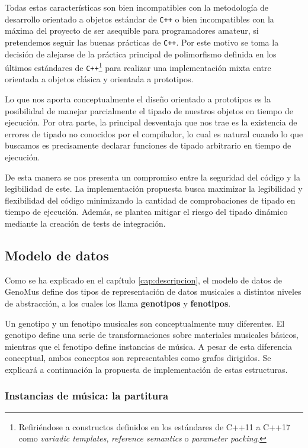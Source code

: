 Todas estas características son bien incompatibles con la metodología de desarrollo orientado a objetos estándar de \verb|C++| o bien incompatibles con la máxima del proyecto de ser asequible para programadores amateur, si pretendemos seguir las buenas prácticas de \verb|C++|. Por este motivo se toma la decisión de alejarse de la práctica principal de polimorfismo definida en los últimos estándares de \verb|C++|\footnote{
    Refiriéndose a constructos definidos en los estándares de C++11 a C++17 como \textit{variadic templates}, \textit{reference semantics} o \textit{parameter packing}. 
} para realizar una implementación mixta entre orientada a objetos clásica y orientada a prototipos. 

Lo que nos aporta conceptualmente el diseño orientado a prototipos es la posibilidad de manejar parcialmente el tipado de nuestros objetos en tiempo de ejecución. Por otra parte, la principal desventaja que nos trae es la existencia de errores de tipado no conocidos por el compilador, lo cual es natural cuando lo que buscamos es precisamente declarar funciones de tipado arbitrario en tiempo de ejecución.

De esta manera se nos presenta un compromiso entre la seguridad del código y la legibilidad de este. La implementación propuesta busca maximizar la legibilidad y flexibilidad del código minimizando la cantidad de comprobaciones de tipado en tiempo de ejecución. Además, se plantea mitigar el riesgo del tipado dinámico mediante la creación de tests de integración.

\subsection{Modelo de datos}

Como se ha explicado en el capítulo \ref{cap:descripcion}, el modelo de datos de GenoMus define dos tipos de representación de datos musicales a distintos niveles de abstracción, a los cuales los llama \textbf{genotipos} y \textbf{fenotipos}.

Un genotipo y un fenotipo musicales son conceptualmente muy diferentes. El genotipo define una serie de transformaciones sobre materiales musicales básicos, mientras que el fenotipo define instancias de música. A pesar de esta diferencia conceptual, ambos conceptos son representables como grafos dirigidos. Se explicará a continuación la propuesta de implementación de estas estructuras.

\subsubsection{Instancias de música: la partitura}

